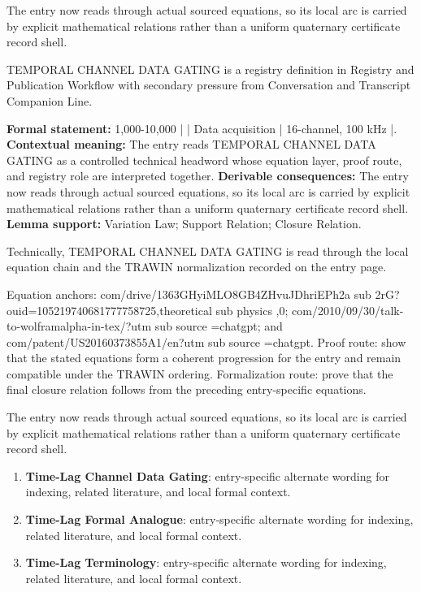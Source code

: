 The entry now reads through actual sourced equations, so its local arc is carried by explicit mathematical relations rather than a uniform quaternary certificate record shell.
\clearpage


\begingroup\small
{}
TEMPORAL CHANNEL DATA GATING is a registry definition in Registry and Publication Workflow with secondary pressure from Conversation and Transcript Companion Line.

\begingroup\footnotesize\setlength{\emergencystretch}{3em}\sloppy
\textbf{Formal statement:} 1,000-10,000 | | Data acquisition | 16-channel, 100 kHz |. \textbf{Contextual meaning:} The entry reads TEMPORAL CHANNEL DATA GATING as a controlled technical headword whose equation layer, proof route, and registry role are interpreted together. \textbf{Derivable consequences:} The entry now reads through actual sourced equations, so its local arc is carried by explicit mathematical relations rather than a uniform quaternary certificate record shell. \textbf{Lemma support:} Variation Law; Support Relation; Closure Relation.\par
\endgroup

Technically, TEMPORAL CHANNEL DATA GATING is read through the local equation chain and the TRAWIN normalization recorded on the entry page.

Equation anchors: com/drive/1363GHyiMLO8GB4ZHvuJDhriEPh2a sub 2rG?ouid=105219740681777758725,theoretical sub physics ,0; com/2010/09/30/talk-to-wolframalpha-in-tex/?utm sub source =chatgpt; and com/patent/US20160373855A1/en?utm sub source =chatgpt. Proof route: show that the stated equations form a coherent progression for the entry and remain compatible under the TRAWIN ordering. Formalization route: prove that the final closure relation follows from the preceding entry-specific equations.

The entry now reads through actual sourced equations, so its local arc is carried by explicit mathematical relations rather than a uniform quaternary certificate record shell.
\endgroup

\begin{enumerate}[leftmargin=1.6em,itemsep=6pt,topsep=4pt]
\item \textbf{Time-Lag Channel Data Gating}: entry-specific alternate wording for indexing, related literature, and local formal context.
\item \textbf{Time-Lag Formal Analogue}: entry-specific alternate wording for indexing, related literature, and local formal context.
\item \textbf{Time-Lag Terminology}: entry-specific alternate wording for indexing, related literature, and local formal context.
\end{enumerate}

